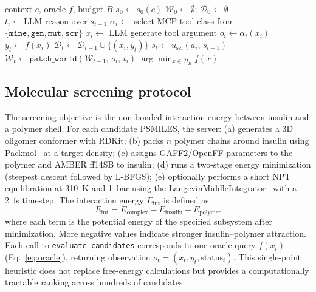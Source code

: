\documentclass[twocolumn]{fairmeta}
\begin{document}
\begin{algorithm}[t]
\caption{Agentic Discovery Loop}\label{alg:agentic}
\small
\begin{algorithmic}[1]
\Require context $c$, oracle $f$, budget $B$
\State $s_0 \gets s_0(c)$ 
\State $\mathcal{W}_0 \gets \emptyset$; $\mathcal{D}_0 \gets \emptyset$
  \State $t_i \gets \text{LLM reason over } s_{t-1}$ 
  \State $\alpha_i \gets$ select MCP tool class from $\{\texttt{mine}, \texttt{gen}, \texttt{mut}, \texttt{scr}\}$
  \State $x_i \gets$ LLM generate tool argument
  \State $o_i \gets \alpha_i(x_i)$ 
    \State $y_t \gets f(x_i)$ 
    \State $\mathcal{D}_t \gets \mathcal{D}_{t-1} \cup \{(x_i, y_t)\}$
  \EndIf
  \State $s_t \gets u_\text{sel}(a_i,\, s_{t-1})$ 
  \State $\mathcal{W}_t \gets \texttt{patch\_world}(\mathcal{W}_{t-1},\, o_i,\, t_i)$
\EndFor
\State \Return $\arg\min_{x \in \mathcal{D}_B} f(x)$
\end{algorithmic}
\end{algorithm}

\subsection{Molecular screening protocol}
\label{sec:screening}

The screening objective is the non-bonded interaction energy between insulin and a polymer shell.
For each candidate PSMILES, the server:
(a) generates a 3D oligomer conformer with RDKit;
(b) packs $n$ polymer chains around insulin using Packmol~\cite{packmol2009} at a target density;
(c) assigns GAFF2/OpenFF parameters to the polymer and AMBER ff14SB to insulin;
(d) runs a two-stage energy minimization (steepest descent followed by L-BFGS);
(e) optionally performs a short NPT equilibration at 310~K and 1~bar using the LangevinMiddleIntegrator~\cite{eastman2017openmm} with a 2~fs timestep.
The interaction energy $E_\text{int}$ is defined as
\begin{equation}
E_\text{int} = E_\text{complex} - E_\text{insulin} - E_\text{polymer}
\label{eq:eint}
\end{equation}
where each term is the potential energy of the specified subsystem after minimization.
More negative values indicate stronger insulin--polymer attraction.
Each call to \texttt{evaluate\_candidates} corresponds to one oracle query $f(x_t)$ (Eq.~\ref{eq:oracle}), returning observation $o_t = (x_t, y_t, \text{status}_t)$.
This single-point heuristic does not replace free-energy calculations but provides a computationally tractable ranking across hundreds of candidates.
\end{document}
